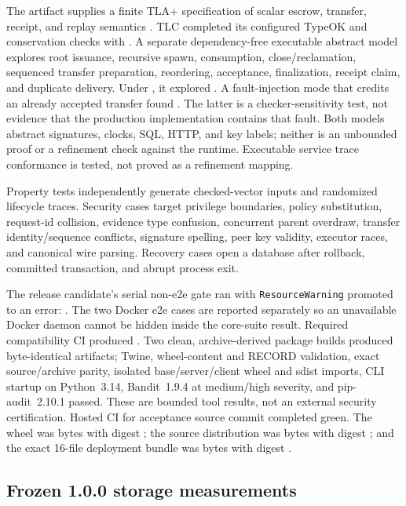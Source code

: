 \documentclass[10pt]{article}
\newcommand{\code}[1]{\nolinkurl{#1}}
\begin{document}
The artifact supplies a finite TLA+ specification of scalar escrow, transfer, receipt, and replay
semantics \citep{lamport1994tla}. TLC completed its configured TypeOK and conservation checks with
\TLCCheckSummary. A separate dependency-free executable abstract model explores root issuance,
recursive spawn, consumption, close/reclamation, sequenced transfer preparation, reordering,
acceptance, finalization, receipt claim, and duplicate delivery. Under \ModelCheckBounds, it
explored \ModelCheckSummary. A fault-injection mode that credits an already accepted transfer found
\MutationCheckSummary. The latter is a checker-sensitivity test, not evidence that the production
implementation contains that fault. Both models abstract signatures, clocks, SQL, HTTP, and key
labels; neither is an unbounded proof or a refinement check against the runtime. Executable service
trace conformance is tested, not proved as a refinement mapping.

Property tests independently generate checked-vector inputs and randomized lifecycle traces.
Security cases target privilege boundaries, policy substitution, request-id collision, evidence
type confusion, concurrent parent overdraw, transfer identity/sequence conflicts, signature
spelling, peer key validity, executor races, and canonical wire parsing. Recovery cases open a
database after rollback, committed transaction, and abrupt process exit.

The release candidate's serial non-e2e gate ran with \code{ResourceWarning} promoted to an error:
\CoreTestSummary. The
two Docker e2e cases are reported separately so an unavailable Docker daemon cannot be hidden
inside the core-suite result. Required compatibility CI produced \CompatibilitySummary. Two clean,
archive-derived package builds produced byte-identical artifacts; Twine, wheel-content and RECORD
validation, exact source/archive parity, isolated base/server/client wheel and sdist imports, CLI
startup on Python~3.14, Bandit~1.9.4 at medium/high severity, and pip-audit~2.10.1 passed. These are
bounded tool results, not an external security certification. Hosted CI for acceptance source
commit \ProductionSourceCommit{} completed green. The wheel was
\WheelBytes{} bytes with digest \WheelDigestDisplay; the source distribution was \SdistBytes{} bytes
with digest \SdistDigestDisplay; and the exact 16-file deployment bundle was \DeploymentBytes{}
bytes with digest \DeploymentDigestDisplay.

\subsection{Frozen 1.0.0 storage measurements}
\end{document}
